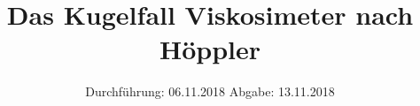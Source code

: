

\subject{Nr. 207}
\title{Das Kugelfall Viskosimeter nach Höppler}
\date{%
  Durchführung: 06.11.2018
  \hspace{3em}
  Abgabe: 13.11.2018
}



\maketitle
\thispagestyle{empty}
\tableofcontents
\newpage






\printbibliography{}


